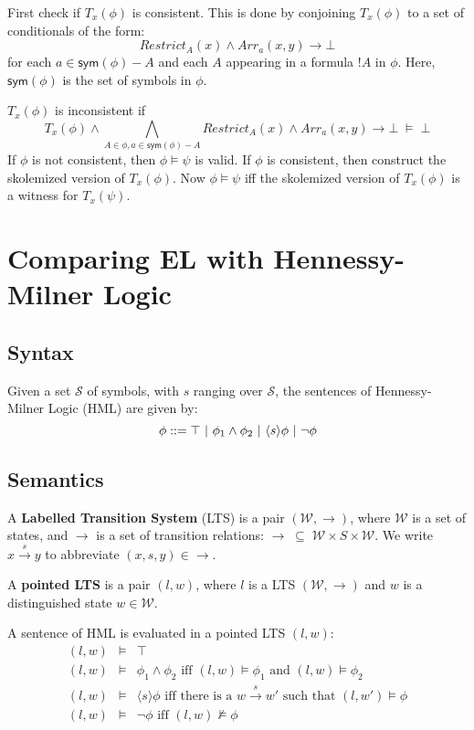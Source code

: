 First check if $T_x(\phi)$ is consistent.
This is done by conjoining $T_x(\phi)$ to a set of conditionals of the form:
\[
Restrict_A(x) \land Arr_a(x,y) \rightarrow \bot
\]
for each $a \in \mathsf{sym}(\phi)-A$ and each $A$ appearing in a formula $!A$ in $\phi$.
Here, $\mathsf{sym}(\phi)$ is the set of symbols in $\phi$.

$T_x(\phi)$ is inconsistent if 
\[
T_x(\phi) \land \bigwedge_{A \in \phi, a \in\mathsf{sym}(\phi)-A} Restrict_A(x) \land Arr_a(x,y) \rightarrow \bot \; \models \; \bot
\]
If $\phi$ is not consistent, then $\phi \models \psi$ is valid.
If $\phi$ is consistent, then construct the skolemized version of $T_x(\phi)$. 
Now $\phi \models \psi$ iff the skolemized version of  $T_x(\phi)$ is a witness for $T_x(\psi)$. 

\section{Comparing EL with Hennessy-Milner Logic}
\subsection{Syntax}
Given a set $\mathcal{S}$ of symbols, with $s$ ranging over $\mathcal{S}$, the sentences of Hennessy-Milner Logic (HML) are given by:
\[
\phi ::= \top \ | \  \phi_1 \land \phi_2 \ | \  \langle s \rangle \phi \ | \  \neg \phi 
\]
\subsection{Semantics}
A {\bf Labelled Transition System} (LTS) is a pair $(\mathcal{W}, \rightarrow)$, where $\mathcal{W}$ is a set of states, and $\rightarrow$ is a set of transition relations: $\rightarrow \; \subseteq \; \mathcal{W} \times S \times \mathcal{W}$.
We write $x \xrightarrow{s} y$ to abbreviate $(x,s,y) \in \rightarrow$.

A {\bf pointed LTS} is a pair $(l, w)$, where $l$ is a LTS $(\mathcal{W}, \rightarrow)$ and $w$ is a distinguished state $w \in \mathcal{W}$.

A sentence of HML is evaluated in a pointed LTS $(l, w)$:
\begin{eqnarray}
(l,w) & \models & \top \nonumber \\
(l,w) & \models & \phi_1 \land \phi_2 \mbox{ iff } (l,w)  \models \phi_1 \mbox { and } (l,w) \models \phi_2 \nonumber \\
(l,w) & \models & \langle s \rangle \phi \mbox{ iff there is a } w \xrightarrow{s} w' \mbox { such that } (l,w') \models \phi \nonumber \\
(l,w) & \models & \neg \phi \mbox{ iff } (l,w)  \nvDash \phi \nonumber
\end{eqnarray}

